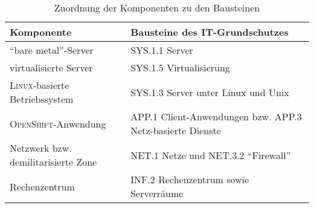 \begin{table*}[h!]
	\centering
	
	\begin{tabular}{@{}lp{8.0cm}@{}}\toprule[1.5pt]
		
		\textbf{Komponente} & \textbf{Bausteine des IT-Grundschutzes}  \\ \midrule
		
		\enquote{bare metal}-Server & SYS.1.1 Server \\
		virtualisierte Server & SYS.1.5 Virtualisierung \\
		\textsc{Linux}-basierte Betriebssystem & SYS.1.3 Server unter Linux und Unix\\
		\textsc{OpenShift}-Anwendung & APP.1 Client-Anwendungen bzw. APP.3 Netz-basierte Dienste \\
		Netzwerk bzw. demilitarisierte Zone & NET.1 Netze und NET.3.2 \enquote{Firewall}\\
		Rechenzentrum & INF.2 Rechenzentrum sowie Serverräume\\
		
		\bottomrule[1.5pt]
	\end{tabular}
	
	\caption{Zuordnung der Komponenten zu den Bausteinen}
	\label{tab:zuordnungKompBau}
	
\end{table*}